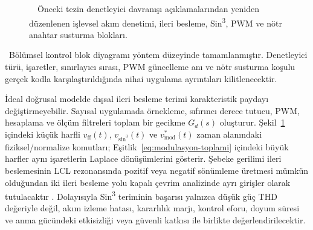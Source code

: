 \begin{figure}[H]
{%
  }
  \caption{\eskitezetiketi\ \juriistegietiketi\ Önceki tezin denetleyici davranışı açıklamalarından yeniden düzenlenen işlevsel akım denetimi, ileri besleme, Sin\textsuperscript{3}, PWM ve nötr anahtar susturma blokları.}
  \label{fig:denetim-modulasyon-blok}
\end{figure}

\begin{center}
\juriistegietiketi\ \small Bölümsel kontrol blok diyagramı yöntem düzeyinde tamamlanmıştır. Denetleyici türü, işaretler, sınırlayıcı sırası, PWM güncelleme anı ve nötr susturma koşulu gerçek kodla karşılaştırıldığında nihai uygulama ayrıntıları kilitlenecektir.
\end{center}

İdeal doğrusal modelde dışsal ileri besleme terimi karakteristik paydayı değiştirmeyebilir. Sayısal uygulamada örnekleme, sıfırıncı derece tutucu, PWM, hesaplama ve ölçüm filtreleri toplam bir gecikme $G_d(s)$ oluşturur. Şekil~\ref{fig:denetim-modulasyon-blok} içindeki küçük harfli $v_{\mathrm{ff}}(t)$, $v_{\sin^3}(t)$ ve $v_{\mathrm{mod}}^{\ast}(t)$ zaman alanındaki fiziksel/normalize komutları; Eşitlik~\eqref{eq:modulasyon-toplami} içindeki büyük harfler aynı işaretlerin Laplace dönüşümlerini gösterir. Şebeke gerilimi ileri beslemesinin LCL rezonansında pozitif veya negatif sönümleme üretmesi mümkün olduğundan iki ileri besleme yolu kapalı çevrim analizinde ayrı girişler olarak tutulacaktır \citep{Lu2016,Wang2024}. Dolayısıyla Sin\textsuperscript{3} teriminin başarısı yalnızca düşük güç THD değeriyle değil, akım izleme hatası, kararlılık marjı, kontrol eforu, doyum süresi ve anma gücündeki etkisizliği veya güvenli katkısı ile birlikte değerlendirilecektir.

